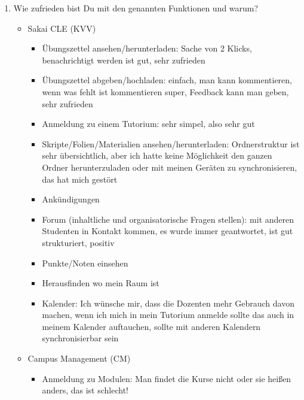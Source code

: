 \documentclass{article}
\begin{document}
\begin{enumerate}
\item Wie zufrieden bist Du mit den genannten Funktionen und warum?
\begin{itemize}
\item Sakai CLE (KVV)
\begin{itemize}
\item Übungszettel ansehen/herunterladen: Sache von 2 Klicks, benachrichtigt werden ist gut, sehr zufrieden
\item Übungszettel abgeben/hochladen: einfach, man kann kommentieren, wenn was fehlt ist kommentieren super, Feedback kann man geben, sehr zufrieden
\item Anmeldung zu einem Tutorium: sehr simpel, also sehr gut
\item Skripte/Folien/Materialien ansehen/herunterladen: Ordnerstruktur ist sehr übersichtlich, aber ich hatte keine Möglichkeit den ganzen Ordner herunterzuladen oder mit meinen Geräten zu synchronisieren, das hat mich gestört
\item Ankündigungen
\item Forum (inhaltliche und organisatorische Fragen stellen): mit anderen Studenten in Kontakt kommen, es wurde immer geantwortet, ist gut strukturiert, positiv
\item Punkte/Noten einsehen
\item Herausfinden wo mein Raum ist
\item Kalender: Ich wünsche mir, dass die Dozenten mehr Gebrauch davon machen, wenn ich mich in mein Tutorium anmelde sollte das auch in meinem Kalender auftauchen, sollte mit anderen Kalendern synchronisierbar sein
\end{itemize}
\item Campus Management (CM)
\begin{itemize}
\item Anmeldung zu Modulen: Man findet die Kurse nicht oder sie heißen anders, das ist schlecht!
\end{itemize}
\end{itemize}


\end{enumerate}
\end{document}
